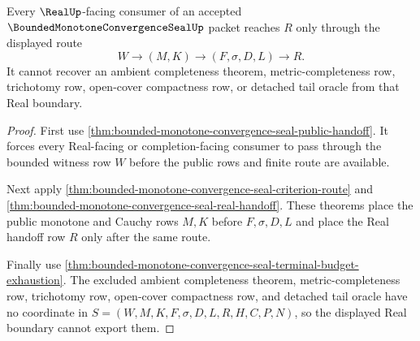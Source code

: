\begin{theorem}
\label{thm:bounded-monotone-convergence-seal-real-boundary-nonescape}
Every $\RealUp$-facing consumer of an accepted $\BoundedMonotoneConvergenceSealUp$ packet reaches $R$ only through the displayed route
$$
W \to (M,K) \to (F,\sigma,D,L) \to R.
$$
It cannot recover an ambient completeness theorem, metric-completeness row, trichotomy row, open-cover compactness row, or detached tail oracle from that Real boundary.
\end{theorem}
\begin{proof}
First use \autoref{thm:bounded-monotone-convergence-seal-public-handoff}. It forces every Real-facing or completion-facing consumer to pass through the bounded witness row $W$ before the public rows and finite route are available.

Next apply \autoref{thm:bounded-monotone-convergence-seal-criterion-route} and \autoref{thm:bounded-monotone-convergence-seal-real-handoff}. These theorems place the public monotone and Cauchy rows $M,K$ before $F,\sigma,D,L$ and place the Real handoff row $R$ only after the same route.

Finally use \autoref{thm:bounded-monotone-convergence-seal-terminal-budget-exhaustion}. The excluded ambient completeness theorem, metric-completeness row, trichotomy row, open-cover compactness row, and detached tail oracle have no coordinate in $S=(W,M,K,F,\sigma,D,L,R,H,C,P,N)$, so the displayed Real boundary cannot export them.
\end{proof}

